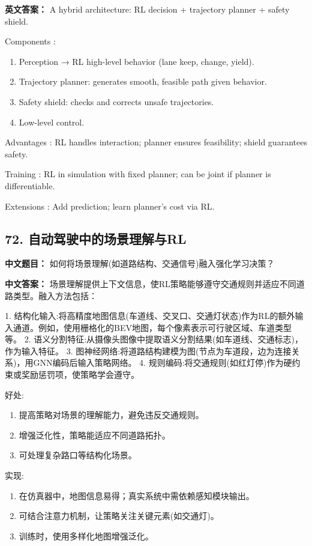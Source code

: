 \documentclass[10pt,a4paper]{ctexart}
\begin{document}
\textbf{英文答案：}  
A hybrid architecture: RL decision + trajectory planner + safety shield.

 Components :
\begin{enumerate}
    \item Perception → RL high-level behavior (lane keep, change, yield).
    \item Trajectory planner: generates smooth, feasible path given behavior.
    \item Safety shield: checks and corrects unsafe trajectories.
    \item Low-level control.
\end{enumerate}

 Advantages : RL handles interaction; planner ensures feasibility; shield guarantees safety.

 Training : RL in simulation with fixed planner; can be joint if planner is differentiable.

 Extensions : Add prediction; learn planner's cost via RL.

\subsection*{72. 自动驾驶中的场景理解与RL}
\textbf{中文题目：} 如何将场景理解(如道路结构、交通信号)融入强化学习决策？

\textbf{中文答案：}  
场景理解提供上下文信息，使RL策略能够遵守交通规则并适应不同道路类型。融入方法包括：

1.  结构化输入:将高精度地图信息(车道线、交叉口、交通灯状态)作为RL的额外输入通道。例如，使用栅格化的BEV地图，每个像素表示可行驶区域、车道类型等。
2.  语义分割特征:从摄像头图像中提取语义分割结果(如车道线、交通标志)，作为输入特征。
3.  图神经网络:将道路结构建模为图(节点为车道段，边为连接关系)，用GNN编码后输入策略网络。
4.  规则编码:将交通规则(如红灯停)作为硬约束或奖励惩罚项，使策略学会遵守。

 好处:
\begin{enumerate}
    \item 提高策略对场景的理解能力，避免违反交通规则。
    \item 增强泛化性，策略能适应不同道路拓扑。
    \item 可处理复杂路口等结构化场景。
\end{enumerate}

 实现:
\begin{enumerate}
    \item 在仿真器中，地图信息易得；真实系统中需依赖感知模块输出。
    \item 可结合注意力机制，让策略关注关键元素(如交通灯)。
    \item 训练时，使用多样化地图增强泛化。
\end{enumerate}
\end{document}
